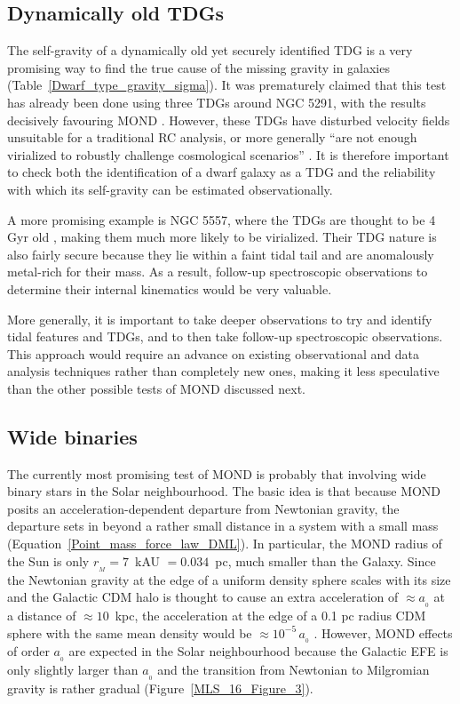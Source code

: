\documentclass[fleqn,usenatbib,useAMS]{mnras} %
\begin{document}
\subsection{Dynamically old TDGs}
\label{Tidal_dwarf_galaxies_future}

The self-gravity of a dynamically old yet securely identified TDG is a very promising way to find the true cause of the missing gravity in galaxies (Table~\ref{Dwarf_type_gravity_sigma}). It was prematurely claimed that this test has already been done using three TDGs around NGC 5291, with the results decisively favouring MOND \citep{Bournaud_2007, Gentile_2007, Milgrom_2007}. However, these TDGs have disturbed velocity fields unsuitable for a traditional RC analysis, or more generally ``are not enough virialized to robustly challenge cosmological scenarios'' \citep{Flores_2016}. It is therefore important to check both the identification of a dwarf galaxy as a TDG and the reliability with which its self-gravity can be estimated observationally.

A more promising example is NGC 5557, where the TDGs are thought to be 4 Gyr old \citep{Duc_2014}, making them much more likely to be virialized. Their TDG nature is also fairly secure because they lie within a faint tidal tail and are anomalously metal-rich for their mass. As a result, follow-up spectroscopic observations to determine their internal kinematics would be very valuable.

More generally, it is important to take deeper observations to try and identify tidal features and TDGs, and to then take follow-up spectroscopic observations. This approach would require an advance on existing observational and data analysis techniques rather than completely new ones, making it less speculative than the other possible tests of MOND discussed next.



\subsection{Wide binaries}
\label{Wide_binaries}

The currently most promising test of MOND is probably that involving wide binary stars in the Solar neighbourhood. The basic idea is that because MOND posits an acceleration-dependent departure from Newtonian gravity, the departure sets in beyond a rather small distance in a system with a small mass (Equation~\ref{Point_mass_force_law_DML}). In particular, the MOND radius of the Sun is only $r_{_M} = 7$~kAU $= 0.034$~pc, much smaller than the Galaxy. Since the Newtonian gravity at the edge of a uniform density sphere scales with its size and the Galactic CDM halo is thought to cause an extra acceleration of $\approx a_{_0}$ at a distance of $\approx 10$~kpc, the acceleration at the edge of a 0.1 pc radius CDM sphere with the same mean density would be $\approx 10^{-5} \, a_{_0}$ \citep{Acedo_2020}. However, MOND effects of order $a_{_0}$ are expected in the Solar neighbourhood because the Galactic EFE is only slightly larger than $a_{_0}$ \citep{Klioner_2021} and the transition from Newtonian to Milgromian gravity is rather gradual (Figure~\ref{MLS_16_Figure_3}).
\end{document}
